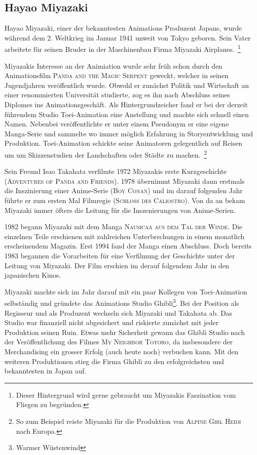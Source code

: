 \newpage
\subsection{Hayao Miyazaki}
Hayao Miyazaki, einer der bekanntesten Animations Produzent Japans, wurde während dem 2. Weltkrieg im Januar 1941 unweit von Tokyo geboren. Sein Vater arbeitete für seinen Bruder in der Maschinenbau Firma Miyazaki Airplanes.~\footnote{Dieser Hintergrund wird gerne gebraucht um Miyazakis Faszination vom Fliegen zu begründen.} 

Miyazakis Interesse an der Animiation wurde sehr früh schon durch den Animationsfilm \textsc{Panda and the Magic Serpent} geweckt, welcher in seinen Jugendjahren veröffentlich wurde. Obwohl er zunächst Politik und Wirtschaft an einer renommierten Universität studierte, zog es ihn nach Abschluss seines Diplomes ins Animationsgeschäft. Als Hintergrundzeicher fand er bei der derzeit führendem Studio Toei-Animation eine Anstellung und machte sich schnell einen Namen. Nebenbei veröffentlichte er unter einem Pseudonym er eine eigene Manga-Serie und sammelte wo immer möglich Erfahrung in Storyentwicklung und Produktion. Toei-Animation schickte seine Animatoren gelegentlich auf Reisen um um Skizzenstudien der Landschaften oder Städte zu machen.~\footnote{So zum Beispiel reiste Miyazaki für die Produktion von \textsc{Alpine Girl Heidi} nach Europa.} 

Sein Freund Isao Takahata verfilmte 1972 Miyazakis erste Kurzgeschichte (\textsc{Adventures of Panda and Friends}). 1978 übernimmt Miyazaki dann erstmals die Inszinierung einer Anime-Serie (\textsc{Boy Conan}) und im darauf folgenden Jahr führte er zum ersten Mal Filmregie (\textsc{Schloss des Caliostro}). Von da an bekam Miyazaki immer öfters die Leitung für die Inszenierungen von Anime-Serien.

1982 begann Miyazaki mit dem Manga \textsc{Nausicaä aus dem Tal der Winde}. Die einzelnen Teile erschienen mit zahlreichen Unterbrechungen in einem monatlich erscheinendem Magazin. Erst 1994 fand der Manga einen Abschluss. Doch bereits 1983 begannen die Vorarbeiten für eine Verfilmung der Geschichte unter der Leitung von Miyazaki. Der Film erschien im derauf folgendem Jahr in den japanischen Kinos. 

Miyazaki machte sich im Jahr darauf mit ein paar Kollegen von Toei-Animation selbständig und gründete das Animations Studio Ghibli\footnote{Warmer Wüstenwind}. Bei der Position als Regisseur und als Produzent wechseln sich Miyazaki und Takahata ab. Das Studio war finanziell nicht abgesichert und riskierte zunächst mit jeder Produktion seinen Ruin. Etwas mehr Sicherheit gewann das Ghibli Studio nach der Veröffentlichung des Filmes \textsc{My Neighbor Totoro}, da insbesondere der Merchandising ein grosser Erfolg (auch heute noch) verbuchen kann. Mit den weiteren Produktionen stieg die Firma Ghibli zu den erfolgreichsten und bekanntesten in Japan auf.

